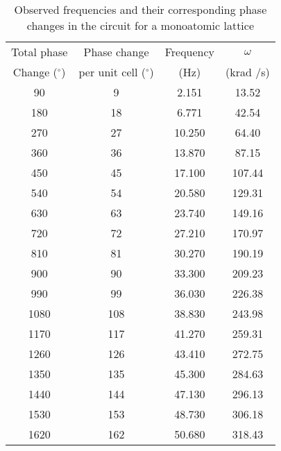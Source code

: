 \begin{table}[]
    \centering
    \begin{tabular}{|c|c|c|c|}
    \hline
    Total phase & Phase change & Frequency & $\omega$ \\
    Change  ($^\circ$) & per unit cell ($^\circ$) & (Hz) & (krad /s) \\ \hline
    90 & 9 & 2.151 & 13.52 \\ 
    180 & 18 & 6.771 & 42.54 \\ 
    270 & 27 & 10.250 & 64.40 \\ 
    360 & 36 & 13.870 & 87.15 \\ 
    450 & 45 & 17.100 & 107.44 \\ 
    540 & 54 & 20.580 & 129.31 \\ 
    630 & 63 & 23.740 & 149.16 \\ 
    720 & 72 & 27.210 & 170.97 \\ 
    810 & 81 & 30.270 & 190.19 \\ 
    900 & 90 & 33.300 & 209.23 \\ 
    990 & 99 & 36.030 & 226.38 \\ 
    1080 & 108 & 38.830 & 243.98 \\ 
    1170 & 117 & 41.270 & 259.31 \\ 
    1260 & 126 & 43.410 & 272.75 \\ 
    1350 & 135 & 45.300 & 284.63 \\ 
    1440 & 144 & 47.130 & 296.13 \\ 
    1530 & 153 & 48.730 & 306.18 \\ 
    1620 & 162 & 50.680 & 318.43 \\ \hline
    \end{tabular}
    \caption{Observed frequencies and their corresponding phase changes in the circuit for a monoatomic lattice}
    \label{tab:mono1}
\end{table}